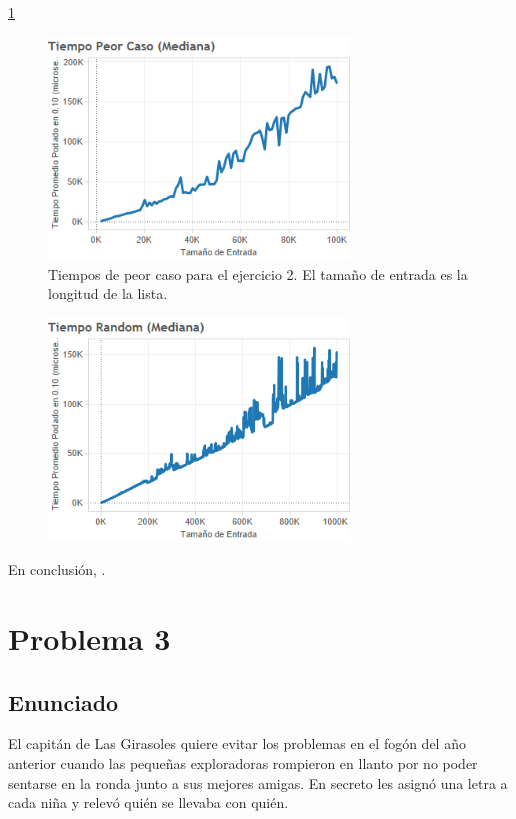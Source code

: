 \documentclass{article}
\theoremstyle{definition}
\theoremstyle{remark}
\begin{document}
\ref{grf:ex2-worst}

\begin{figure}[h!]
\centering
\label{grf:ex2-worst}
\includegraphics[width=8cm]{images/ex2-worst}
\caption{Tiempos de peor caso para el ejercicio 2. El tamaño de entrada es la longitud de la lista.}
\end{figure}

\begin{figure}[h!]
\centering
\label{grf:ex2-random}
\includegraphics[width=8cm]{images/ex2-random}
\caption{}
\end{figure}


En conclusión, .

\section{Problema 3}

\subsection{Enunciado}

El capitán de Las Girasoles quiere evitar los problemas en el fogón del año anterior cuando las pequeñas exploradoras rompieron en llanto por no poder sentarse en la ronda junto a sus mejores amigas. En secreto les asignó una letra a cada niña y relevó quién se llevaba con quién.
\end{document}
